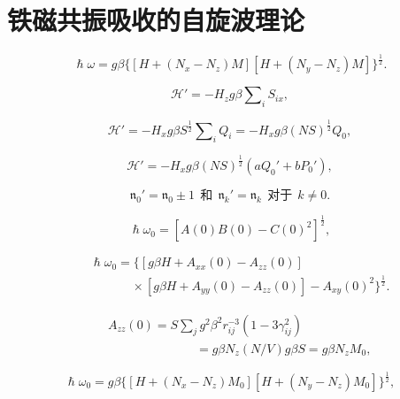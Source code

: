 \documentclass{article}
\begin{document}

\section{铁磁共振吸收的自旋波理论} \label{sec:6}

\begin{equation} \label{eq:61}
\hslash\omega=g\beta\{[H+(N_x-N_z)M][H+(N_y-N_z)M]\}^{\frac{1}{2}}.
\end{equation}

\begin{equation} \label{eq:62}
\mathcal{H}'=-H_zg\beta\sum\nolimits_iS_{ix},
\end{equation}

\begin{equation} \label{eq:63}
\mathcal{H}'=-H_xg\beta S^{\frac{1}{2}}\sum\nolimits_iQ_i=-H_xg\beta(NS)^{\frac{1}{2}}Q_0,
\end{equation}

\begin{equation} \label{eq:64}
\mathcal{H}'=-H_xg\beta(NS)^{\frac{1}{2}}(aQ_0'+bP_0'),
\end{equation}

\begin{equation} \label{eq:65}
\mathfrak{n}_0'=\mathfrak{n}_0\pm 1~~\text{和}~~\mathfrak{n}_k'=\mathfrak{n}_k~~\text{对于}~~k\neq 0.
\end{equation}

\begin{equation} \label{eq:66}
\hslash\omega_0=[A(0)B(0)-C(0)^2]^{\frac{1}{2}},
\end{equation}

\begin{eqnarray} \label{eq:67}
&&\hslash\omega_0=\{[g\beta H+A_{xx}(0)-A_{zz}(0)]\nonumber\\
&&\phantom{~~~~~~~~~~~~~~~}\times[g\beta H+A_{yy}(0)-A_{zz}(0)]-A_{xy}(0)^2\}^{\frac{1}{2}}.
\end{eqnarray}

\begin{eqnarray} \label{eq:68}
&&A_{zz}(0)=S\sum\nolimits_jg^2\beta^2r_{ij}^{-3}(1-3\gamma_{ij}^2)\nonumber\\
&&\phantom{~~~~~~~~~~~~~~~~~~~~~~~~~~~~~~~~}=g\beta N_z(N/V)g\beta S=g\beta N_zM_0,
\end{eqnarray}

\begin{equation} \label{eq:69}
\hslash\omega_0=g\beta\{[H+(N_x-N_z)M_0][H+(N_y-N_z)M_0]\}^{\frac{1}{2}},
\end{equation}
\end{document}
